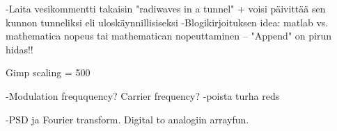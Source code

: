 -Laita vesikommentti takaisin "radiwaves in a tunnel" + voisi päivittää sen kunnon tunneliksi eli uloskäynnillisiseksi
-Blogikirjoituksen idea: matlab vs. mathematica nopeus tai mathematican nopeuttaminen – "Append" on pirun hidas!!

Gimp scaling = 500 

-Modulation freququency? Carrier frequency? 
-poista turha reds

-PSD ja Fourier transform. Digital to analogiin arrayfun.

